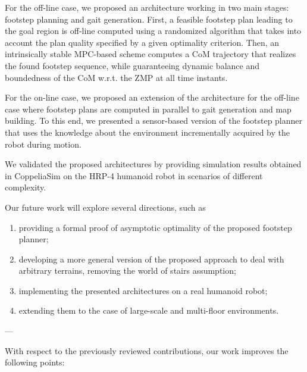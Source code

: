 For the off-line case, we proposed an architecture working in two main stages: footstep planning and gait generation.
First, a feasible footstep plan leading to the goal region is off-line computed using a randomized algorithm that takes into account the plan quality specified by a given optimality criterion.
Then, an intrinsically stable MPC-based scheme computes a CoM trajectory that realizes the found footstep sequence, while guaranteeing dynamic balance and boundedness of the CoM w.r.t. the ZMP at all time instants.

For the on-line case, we proposed an extension of the architecture for the off-line case where footstep plans are computed in parallel to gait generation and map building.
To this end, we presented a sensor-based version of the footstep planner that uses the knowledge about the environment incrementally acquired by the robot during motion.

We validated  the proposed architectures by providing simulation results obtained in CoppeliaSim on the HRP-4 humanoid robot in scenarios of different complexity.

Our future work will explore several directions, such as
\begin{enumerate}
    \item providing a formal proof of asymptotic optimality of the proposed footstep planner;
    \item developing a more general version of the proposed approach to deal with arbitrary terrains, removing the world of stairs assumption;
    \item implementing the presented architectures on a real humanoid robot;
    \item extending them to the case of large-scale and multi-floor environments.
\end{enumerate}

---

With respect to the previously reviewed contributions, our work improves the following points:

